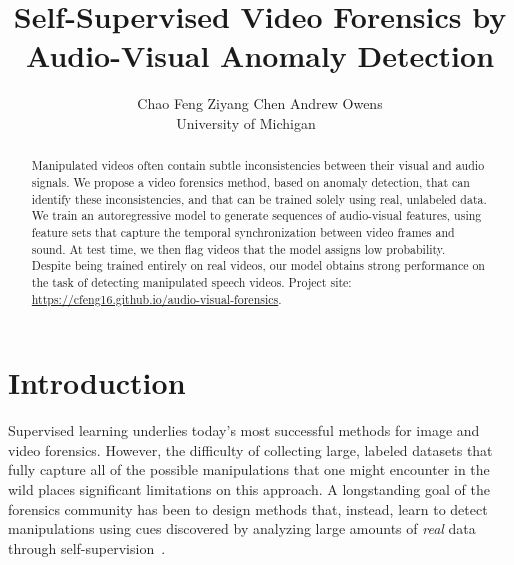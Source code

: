 \documentclass[10pt,twocolumn,letterpaper]{article}
\begin{document}
\title{Self-Supervised Video Forensics by Audio-Visual Anomaly Detection}


\author{Chao Feng \qquad Ziyang Chen \qquad Andrew Owens \vspace{3.5mm}\\ 
University of Michigan~~~~\\
}
\maketitle

\begin{abstract}
Manipulated videos often contain subtle inconsistencies between their visual and audio signals. We propose a video forensics method, based on anomaly detection, that can identify these inconsistencies, and that can be trained solely using real, unlabeled data. We train an autoregressive model to generate sequences of audio-visual features, using feature sets that capture the temporal synchronization between video frames and sound. At test time, we then flag videos that the model assigns low probability. Despite being trained entirely on real videos, our model obtains strong performance on the task of detecting manipulated speech videos. Project site: \href{https://cfeng16.github.io/audio-visual-forensics/}{https://cfeng16.github.io/audio-visual-forensics}.















\end{abstract} 

\section{Introduction}
\label{sec:intro}


















Supervised learning underlies today's most successful methods for image and video forensics. However, the difficulty of collecting large, labeled datasets that fully capture all of the possible manipulations that one might encounter in the wild places significant limitations on this approach. A longstanding goal of the forensics community has been to design methods that, instead, learn to detect manipulations using cues discovered by analyzing large amounts of {\em real} data through self-supervision~\cite{huh2018fighting,cozzolino2019noiseprint}.
\end{document}
